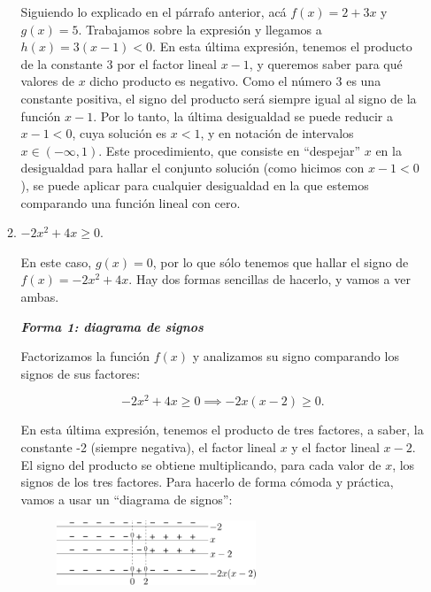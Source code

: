 \documentclass[12pt]{article}
\theoremstyle{definition}
\begin{document}
\begin{enumerate}
\begin{enumerate}
Siguiendo lo explicado en el párrafo anterior, acá $f(x) = 2 + 3x$ y $g(x) = 5$. Trabajamos sobre la expresión y llegamos a $h(x) = 3(x - 1) < 0$. En esta última expresión, tenemos el producto de la constante 3 por el factor lineal $x - 1$, y queremos saber para qué valores de $x$ dicho producto es negativo. Como el número 3 es una constante positiva, el signo del producto será siempre igual al signo de la función $x - 1$. Por lo tanto, la última desigualdad se puede reducir a $x - 1 < 0$, cuya solución es $x < 1$, y en notación de intervalos $x \in (-\infty,1)$. Este procedimiento, que consiste en ``despejar'' $x$ en la desigualdad para hallar el conjunto solución (como hicimos con $x - 1 < 0$), se puede aplicar para cualquier desigualdad en la que estemos comparando una función lineal con cero.\\
	
\item $-2x^2 + 4x \geq 0$.\\
	
\begin{sloppypar}
	En este caso, $g(x) = 0$, por lo que sólo tenemos que hallar el signo de ${f(x) = -2x^2 + 4x}$. Hay dos formas sencillas de hacerlo, y vamos a ver ambas.\\
\end{sloppypar}
	
\textbf{\textit{Forma 1: diagrama de signos}}
	
Factorizamos la función $f(x)$ y analizamos su signo comparando los signos de sus factores:
	
\[-2x^2 + 4x \geq 0 \implies -2x(x - 2) \geq 0.\]
	
En esta última expresión, tenemos el producto de tres factores, a saber, la constante -2 (siempre negativa), el factor lineal $x$ y el factor lineal $x - 2$. El signo del producto se obtiene multiplicando, para cada valor de $x$, los signos de los tres factores. Para hacerlo de forma cómoda y práctica, vamos a usar un ``diagrama de signos'':
	
\begin{figure}[H]
	\centering
	\includegraphics[width=0.6\textwidth]{16_b1.png}
\end{figure}
	

\end{enumerate}
\end{enumerate}
\end{document}
